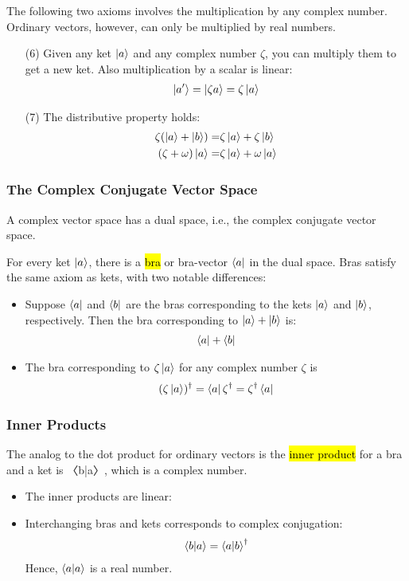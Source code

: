 The following two axioms involves the multiplication by any complex number. Ordinary vectors, however, can only be multiplied by real numbers.
\begin{enumerate}
    \item [(6)]Given any ket $\ket{a}$ and any complex number $\zeta $, you can multiply them to get a new ket. Also multiplication by a scalar is linear: 
    \begin{align*}
        \ket{a'}=\ket{\zeta a}=\zeta \ket{a}
    \end{align*}
    \item [(7)]The distributive property holds: 
    \begin{align*}
        \zeta(\ket{a}+\ket{b})=&\zeta\ket{a}+\zeta\ket{b}\\
        (\zeta+\omega)\ket{a}=&\zeta\ket{a}+\omega\ket{a}
    \end{align*}
\end{enumerate}


\subsubsection{The Complex Conjugate Vector Space}
A complex vector space has a dual space, i.e., the complex conjugate vector space.

For every ket $\ket{a}$, there is a \hl{bra} or bra-vector $\bra{a}$ in the dual space. Bras satisfy the same axiom as kets, with two notable differences:
\begin{itemize}
    \item Suppose $\bra{a}$ and $\bra{b}$ are the bras corresponding to the kets $\ket{a}$ and $\ket{b}$, respectively. Then the bra corresponding to $\ket{a} + \ket{b}$ is:
    \begin{align*}
        \bra{a}+\bra{b}
    \end{align*}
    \item The bra corresponding to $\zeta\ket{a}$ for any complex number $\zeta$ is
    \begin{align*}
        (\zeta\ket{a})^{\dagger}=\bra{a}\zeta^{\dagger}=\zeta^{\dagger}\bra{a}
    \end{align*}
\end{itemize}

\subsubsection{Inner Products}
The analog to the dot product for ordinary vectors is the \hl{inner product} for a bra and a ket is 〈b|a〉, which is a complex number.
\begin{itemize}
    \item The inner products are linear:
    \item Interchanging bras and kets corresponds to complex conjugation:
    \begin{align*}
        \braket{b|a}=\braket{a|b}^{\dagger}
    \end{align*}
    Hence, $\braket{a|a}$ is a real number. 
\end{itemize}

